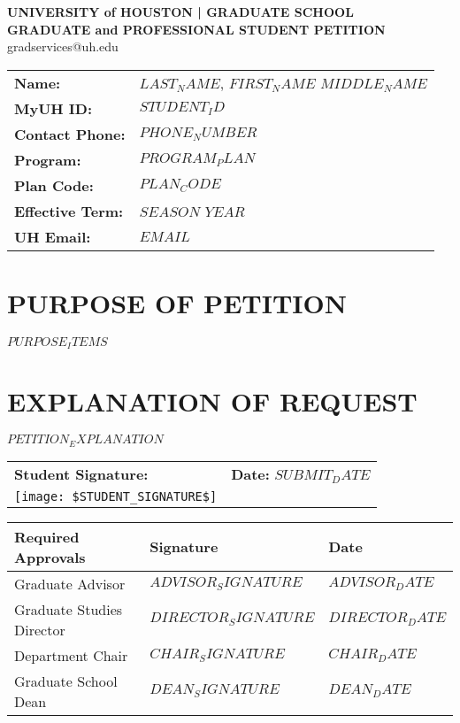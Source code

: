 \documentclass{article}
\begin{document}
\begin{center}
    \Large\textbf{UNIVERSITY of HOUSTON | GRADUATE SCHOOL} \\
    \large\textbf{GRADUATE and PROFESSIONAL STUDENT PETITION} \\
    \small gradservices@uh.edu
\end{center}

\vspace{0.5cm}

\begin{tabular}{ll}
    \textbf{Name:} & $LAST_NAME$, $FIRST_NAME$ $MIDDLE_NAME$ \\
    \textbf{MyUH ID:} & $STUDENT_ID$ \\
    \textbf{Contact Phone:} & $PHONE_NUMBER$ \\
    \textbf{Program:} & $PROGRAM_PLAN$ \\
    \textbf{Plan Code:} & $PLAN_CODE$ \\
    \textbf{Effective Term:} & $SEASON$ $YEAR$ \\
    \textbf{UH Email:} & $EMAIL$
\end{tabular}

\vspace{0.5cm}

\section*{PURPOSE OF PETITION}
\begin{itemize}
    $PURPOSE_ITEMS$
\end{itemize}

\section*{EXPLANATION OF REQUEST}
$PETITION_EXPLANATION$

\vspace{1cm}

\begin{tabular}{p{}p{}}
    \textbf{Student Signature:} & \textbf{Date:} $SUBMIT_DATE$ \\
    \texttt{[image: \$STUDENT\_SIGNATURE\$]} & \\
\end{tabular}

\vspace{1cm}
\begin{tabular}{|l|l|l|}
    \hline
    \textbf{Required Approvals} & \textbf{Signature} & \textbf{Date} \\
    \hline
    Graduate Advisor & $ADVISOR_SIGNATURE$ & $ADVISOR_DATE$ \\
    \hline
    Graduate Studies Director & $DIRECTOR_SIGNATURE$ & $DIRECTOR_DATE$ \\
    \hline
    Department Chair & $CHAIR_SIGNATURE$ & $CHAIR_DATE$ \\
    \hline
    Graduate School Dean & $DEAN_SIGNATURE$ & $DEAN_DATE$ \\
    \hline
\end{tabular}
\end{document}
